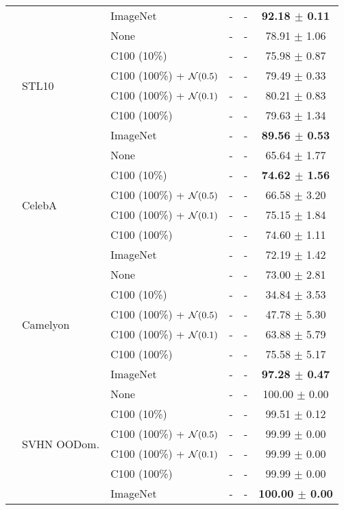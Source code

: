 \begin{table}[!htb]
\begin{tabular}{lllccc}
    & &ImageNet &- &- &\textbf{92.18 $\pm$ 0.11} \\
    \cmidrule[0.1pt](lr){2-6}
    &\multirow{6}{*}{STL10} &None &- &- &78.91 $\pm$ 1.06 \\
    & &C100 (10\%) &- &- &75.98 $\pm$ 0.87 \\
& &C100 (100\%) + ${\mathcal{N}}(0.5)$ &- &- &79.49 $\pm$ 0.33 \\
& &C100 (100\%) + ${\mathcal{N}}(0.1)$ &- &- &80.21 $\pm$ 0.83 \\
    & &C100 (100\%) &- &- &79.63 $\pm$ 1.34 \\
    & &ImageNet &- &- &\textbf{89.56 $\pm$ 0.53} \\
    \cmidrule[0.1pt](lr){2-6}
    &\multirow{6}{*}{CelebA} &None &- &- &65.64 $\pm$ 1.77 \\
    & &C100 (10\%) &- &- &\textbf{74.62 $\pm$ 1.56} \\
& &C100 (100\%) + ${\mathcal{N}}(0.5)$ &- &- &66.58 $\pm$ 3.20 \\
& &C100 (100\%) + ${\mathcal{N}}(0.1)$ &- &- &75.15 $\pm$ 1.84 \\
    & &C100 (100\%) &- &- &74.60 $\pm$ 1.11 \\
    & &ImageNet &- &- &72.19 $\pm$ 1.42 \\
    \cmidrule[0.1pt](lr){2-6}
    &\multirow{6}{*}{Camelyon} &None &- &- &73.00 $\pm$ 2.81 \\
    & &C100 (10\%) &- &- &34.84 $\pm$ 3.53 \\
& &C100 (100\%) + ${\mathcal{N}}(0.5)$ &- &- &47.78 $\pm$ 5.30 \\
& &C100 (100\%) + ${\mathcal{N}}(0.1)$ &- &- &63.88 $\pm$ 5.79 \\
    & &C100 (100\%) &- &- &75.58 $\pm$ 5.17 \\
    & &ImageNet &- &- &\textbf{97.28 $\pm$ 0.47} \\
    \cmidrule[0.1pt](lr){2-6}
    &\multirow{6}{*}{SVHN OODom.} &None &- &- &100.00 $\pm$ 0.00 \\
    & &C100 (10\%) &- &- &99.51 $\pm$ 0.12 \\
& &C100 (100\%) + ${\mathcal{N}}(0.5)$ &- &- &99.99 $\pm$ 0.00 \\
& &C100 (100\%) + ${\mathcal{N}}(0.1)$ &- &- &99.99 $\pm$ 0.00 \\
    & &C100 (100\%) &- &- &99.99 $\pm$ 0.00 \\
    & &ImageNet &- &- &\textbf{100.00 $\pm$ 0.00} \\
    \bottomrule
\end{tabular}
\end{table}

